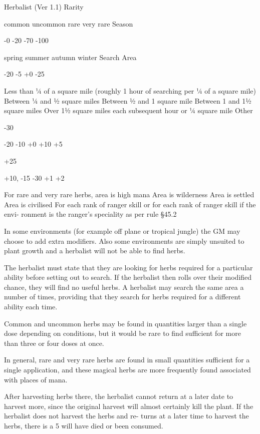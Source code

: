 \begin{Chapter}{Herbalist (Ver 1.1)}
Rarity 

 

common 
uncommon 
rare 
very rare 
Season 

-0 
-20 
-70 
-100 
 

spring 
summer 
autumn 
winter 
Search Area 

-20 
-5 
+0 
-25 

Less than ¼ of a square mile (roughly 1 
hour of searching per ¼ of a square mile) 
Between ¼ and ½ square miles 
Between ½ and 1 square mile 
Between 1 and 1½ square miles 
Over 1½ square miles  
each subsequent hour or ¼ square mile 
Other 

 

-30 

-20 
-10 
+0 
+10 
+5%
 

+25 

+10,  
-15  
-30 
+1%
+2%

For rare and very rare herbs, area is high 
mana  
Area is wilderness  
Area is settled  
Area is civilised 
For each rank of ranger skill  
or for each rank of  ranger skill if the envi-
ronment is the ranger’s speciality as per 
rule §45.2 
 
In  some  environments  (for  example  off  plane  or 
tropical  jungle)  the  GM  may  choose  to  add  extra 
modifiers.  Also  some  environments  are  simply 
unsuited to plant growth and a herbalist will not be 
able to find herbs. 

The  herbalist  must  state  that  they  are  looking  for 
herbs required for a particular ability before setting 
out  to  search.  If  the  herbalist  then  rolls  over  their 
modified chance, they will find no useful herbs. A 
herbalist  may  search  the  same  area  a  number  of 
times, providing that they search for herbs required 
for a different ability each time. 

Common  and  uncommon  herbs  may  be  found  in 
quantities  larger  than  a  single  dose  depending  on 
conditions,  but  it  would  be  rare  to  find  sufficient 
for more than three or four doses at once. 

In  general,  rare  and  very  rare  herbs  are  found  in 
small  quantities  sufficient  for  a  single  application, 
and these magical herbs are more frequently found 
associated with places of mana. 

After  harvesting  herbs  there,  the  herbalist  cannot 
return  at  a  later  date  to  harvest  more,  since  the 
original harvest will almost certainly kill the plant. 
If  the  herbalist  does  not  harvest  the  herbs  and  re-
turns at a later time to harvest the herbs, there is a 
5%
will have died or been consumed. 


\end{Chapter}

